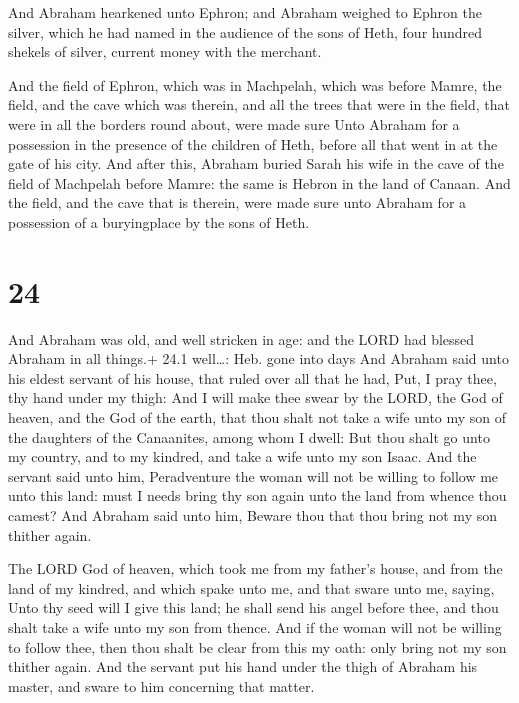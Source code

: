  And Abraham hearkened unto Ephron; and Abraham weighed to
Ephron the silver, which he had named in the audience of the sons of
Heth, four hundred shekels of silver, current money with the merchant.

 And the field of Ephron, which was in Machpelah, which
was before Mamre, the field, and the cave which was therein, and all the
trees that were in the field, that were in all the borders round about,
were made sure  Unto Abraham for a possession in the
presence of the children of Heth, before all that went in at the gate of
his city.  And after this, Abraham buried Sarah his wife in
the cave of the field of Machpelah before Mamre: the same is Hebron in
the land of Canaan.  And the field, and the cave that is
therein, were made sure unto Abraham for a possession of a buryingplace
by the sons of Heth.

\hypertarget{section-23}{%
\section{24}\label{section-23}}

 And Abraham was old, and well stricken in age: and the LORD
had blessed Abraham in all things.+ 24.1 well\ldots: Heb. gone into days
 And Abraham said unto his eldest servant of his house, that
ruled over all that he had, Put, I pray thee, thy hand under my thigh:
 And I will make thee swear by the LORD, the God of heaven,
and the God of the earth, that thou shalt not take a wife unto my son of
the daughters of the Canaanites, among whom I dwell:  But
thou shalt go unto my country, and to my kindred, and take a wife unto
my son Isaac.  And the servant said unto him, Peradventure
the woman will not be willing to follow me unto this land: must I needs
bring thy son again unto the land from whence thou camest? 
And Abraham said unto him, Beware thou that thou bring not my son
thither again.

 The LORD God of heaven, which took me from my father's
house, and from the land of my kindred, and which spake unto me, and
that sware unto me, saying, Unto thy seed will I give this land; he
shall send his angel before thee, and thou shalt take a wife unto my son
from thence.  And if the woman will not be willing to follow
thee, then thou shalt be clear from this my oath: only bring not my son
thither again.  And the servant put his hand under the thigh
of Abraham his master, and sware to him concerning that matter.

